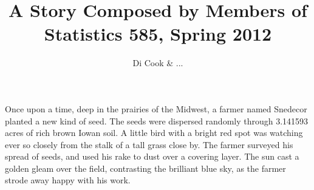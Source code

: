 \documentclass{article}
\begin{document}
\title{A Story Composed by Members of Statistics 585, Spring 2012}
\author{Di Cook \& ...}
\maketitle

Once upon a time, deep in the prairies of the Midwest, a farmer named Snedecor planted a new kind of seed. The seeds were dispersed randomly through 3.141593 acres of rich brown Iowan soil. A little bird with a bright red spot was watching ever so closely  from the stalk of a tall grass close by. The farmer surveyed his spread of seeds, and used his rake to dust  over a covering layer. The sun cast a golden gleam over the field, contrasting the brilliant blue sky, as the farmer strode away happy with his work. 
\end{document}
